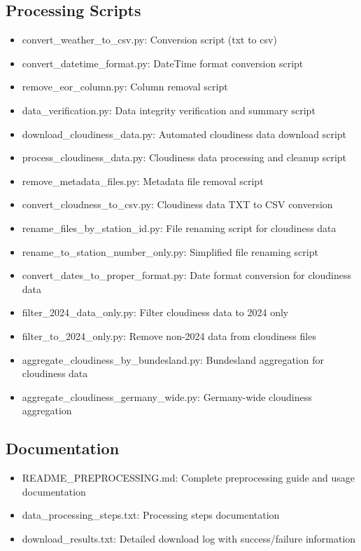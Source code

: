 \documentclass[11pt,a4paper]{article}
\begin{document}
\subsection{Processing Scripts}
\begin{itemize}
    \item convert\_weather\_to\_csv.py: Conversion script (txt to csv)
    \item convert\_datetime\_format.py: DateTime format conversion script
    \item remove\_eor\_column.py: Column removal script
    \item data\_verification.py: Data integrity verification and summary script
    \item download\_cloudiness\_data.py: Automated cloudiness data download script
    \item process\_cloudiness\_data.py: Cloudiness data processing and cleanup script
    \item remove\_metadata\_files.py: Metadata file removal script
    \item convert\_cloudness\_to\_csv.py: Cloudiness data TXT to CSV conversion
    \item rename\_files\_by\_station\_id.py: File renaming script for cloudiness data
    \item rename\_to\_station\_number\_only.py: Simplified file renaming script
    \item convert\_dates\_to\_proper\_format.py: Date format conversion for cloudiness data
    \item filter\_2024\_data\_only.py: Filter cloudiness data to 2024 only
    \item filter\_to\_2024\_only.py: Remove non-2024 data from cloudiness files
    \item aggregate\_cloudiness\_by\_bundesland.py: Bundesland aggregation for cloudiness data
    \item aggregate\_cloudiness\_germany\_wide.py: Germany-wide cloudiness aggregation
\end{itemize}

\subsection{Documentation}
\begin{itemize}
    \item README\_PREPROCESSING.md: Complete preprocessing guide and usage documentation
    \item data\_processing\_steps.txt: Processing steps documentation
    \item download\_results.txt: Detailed download log with success/failure information
\end{itemize}
\end{document}
